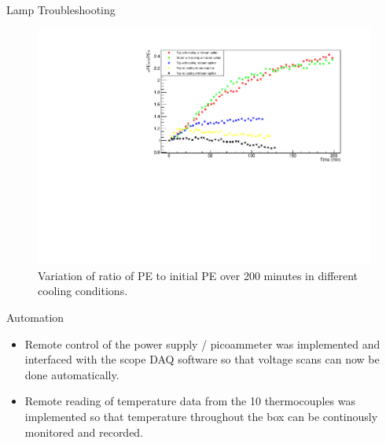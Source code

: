 \documentclass{beamer}
\begin{document}
\begin{frame}{Lamp Troubleshooting}
\begin{figure}
\centering
\includegraphics[height=0.5\textwidth]{NewLampPERatioAug10.pdf}
\caption{Variation of ratio of PE to initial PE over 200 minutes in different cooling conditions.}
\end{figure}
\end{frame}

\begin{frame}{Automation}
\begin{itemize}
\item Remote control of the power supply / picoammeter was implemented and interfaced with the scope DAQ software so that voltage scans can now be done automatically. 
\item Remote reading of temperature data from the 10 thermocouples was implemented so that temperature throughout the box can be continously monitored and recorded.
\end{itemize}
\end{frame}
\end{document}
